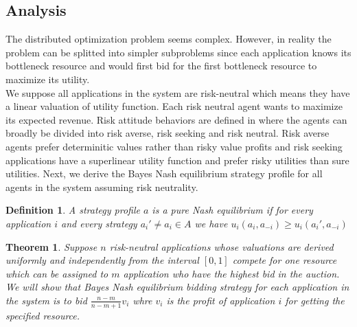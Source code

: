 \subsection{Analysis}
The distributed optimization problem seems complex. However, in reality the problem can be splitted into simpler subproblems since each application knows its bottleneck resource and would first bid for the first bottleneck resource to maximize its utility.\\
\indent We suppose all applications in the system are risk-neutral which means they have a linear valuation of utility function. Each risk neutral agent wants to maximize its expected revenue. Risk attitude behaviors are defined in \cite{ferber1999multi} where the agents can broadly be divided into risk averse, risk seeking and risk neutral. Risk averse agents prefer determinitic values rather than risky value profits and risk seeking applications have a superlinear utility function and prefer risky utilities than sure utilities. Next, we derive the Bayes Nash equilibrium strategy profile for all agents in the system assuming risk neutrality.  \\
\newtheorem{defi}{Definition}
\begin{defi}
A strategy profile $a$ is a pure Nash equilibrium if for every application $i$ and every strategy $a_i' \neq a_i \in A$ we have $u_i(a_i, a_{-i}) \geq u_i(a_i', a_{-i})$
\end{defi}
\newtheorem{theorem}{Theorem}
\begin{theorem}\label{thm:neat}
\label{Auction}
Suppose $n$ risk-neutral applications whose valuations are derived uniformly and independently from the interval $[0,1]$ compete for one resource which can be assigned to $m$ application who have the highest bid in the auction. We will show that Bayes Nash equilibrium bidding strategy for each application in the system is to bid $\frac{n-m}{n-m+1}v_i$ whre $v_i$ is the profit of application $i$ for getting the specified resource.  
\end{theorem}
